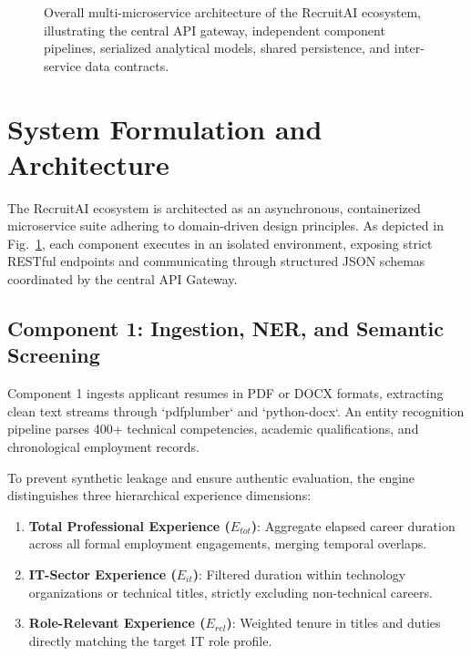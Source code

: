 \documentclass[conference]{IEEEtran}
\begin{document}
\begin{figure}[t]
\caption{Overall multi-microservice architecture of the RecruitAI ecosystem, illustrating the central API gateway, independent component pipelines, serialized analytical models, shared persistence, and inter-service data contracts.}
\label{fig:overall_arch}
\end{figure}

\section{System Formulation and Architecture}
The RecruitAI ecosystem is architected as an asynchronous, containerized microservice suite adhering to domain-driven design principles. As depicted in Fig.~\ref{fig:overall_arch}, each component executes in an isolated environment, exposing strict RESTful endpoints and communicating through structured JSON schemas coordinated by the central API Gateway.

\subsection{Component 1: Ingestion, NER, and Semantic Screening}
Component 1 ingests applicant resumes in PDF or DOCX formats, extracting clean text streams through `pdfplumber` and `python-docx`. An entity recognition pipeline parses 400+ technical competencies, academic qualifications, and chronological employment records. 

To prevent synthetic leakage and ensure authentic evaluation, the engine distinguishes three hierarchical experience dimensions:
\begin{enumerate}
    \item \textbf{Total Professional Experience ($E_{tot}$)}: Aggregate elapsed career duration across all formal employment engagements, merging temporal overlaps.
    \item \textbf{IT-Sector Experience ($E_{it}$)}: Filtered duration within technology organizations or technical titles, strictly excluding non-technical careers.
    \item \textbf{Role-Relevant Experience ($E_{rel}$)}: Weighted tenure in titles and duties directly matching the target IT role profile.
\end{enumerate}
\end{document}
